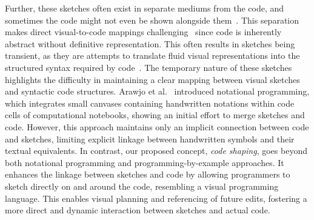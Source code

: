 Further, these sketches often exist in separate mediums from the code, and sometimes the code might not even be shown alongside them~\cite{tldraw}. 
This separation makes direct visual-to-code mappings challenging~\cite{cherubini_lets_2007} since code is inherently abstract without definitive representation.
This often results in sketches being transient, as they are attempts to translate fluid visual representations into the structured syntax required by code~\cite{4782972}. The temporary nature of these sketches highlights the difficulty in maintaining a clear mapping between visual sketches and syntactic code structures. Arawjo et al.~\cite{arawjo_notational_2022} introduced notational programming, which integrates small canvases containing handwritten notations within code cells of computational notebooks, showing an initial effort to merge sketches and code. However, this approach maintains only an implicit connection between code and sketches, limiting explicit linkage between handwritten symbols and their textual equivalents.
In contrast, our proposed concept, \textit{code shaping}, goes beyond both notational programming and programming-by-example approaches\cite{10.1145/22627.22349}. It enhances the linkage between sketches and code by allowing programmers to sketch directly on and around the code, resembling a visual programming language. This enables visual planning and referencing of future edits, fostering a more direct and dynamic interaction between sketches and actual code. 













